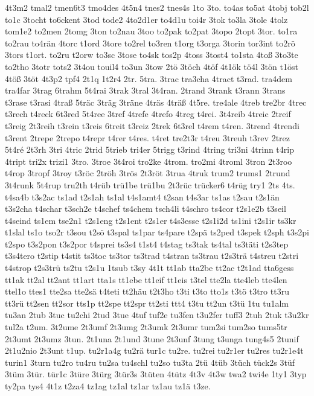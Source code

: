 {4t3m2
tmal2
tmen6t3
tmo4des
4t5n4
tnes2
tnes4s
1to
3to.
to4as
to5at
4tobj
tob2l
to1c
3tocht
to6ckent
3tod
tode2
4to2d1er
to4d1u
toi4r
3tok
to3la
3tole
4tolz
tom1e2
to2men
2tomg
3ton
to2nau
3too
to2pak
to2pat
3topo
2topt
3tor.
to1ra
to2rau
to4rän
4torc
t1ord
3tore
to2rel
to3ren
t1org
t3orga
3torin
tor3int
to2rö
3tors
t1ort.
to2ru
t2orw
to3sc
3tose
to4sk
tos2p
4toss
3tost4
to1sta
4toß
3to3te
to2tho
3totr
tots2
3t4ou
touil4
to3un
3tow
2tö
3töch
4töf
4t1ök
tö4l
3tön
t1öst
4töß
3töt
4t3p2
tpf4
2t1q
1t2r4
2tr.
5tra.
3trac
tra3cha
4tract
t3rad.
tra4dem
tra4far
3trag
6trahm
5t4rai
3trak
3tral
3t4ran.
2trand
3trank
t3rann
3trans
t3rase
t3rasi
4traß
5träc
3träg
3träne
4träs
4träß
4t5re.
tre4ale
4treb
tre2br
4trec
t3rech
t4reck
6t3red
5t4ree
3tref
4trefe
4trefo
4treg
t4rei.
3t4reib
4treic
2treif
t3reig
2t3reih
t3rein
t3reis
6treit
t3reiz
2trek
6t3rel
t4rem
t4ren.
3trend
4trendi
t3rent
2trepe
2trepo
t4repr
t4rer
t4res.
t4ret
tre2t3r
t4reu
3treuh
t3rev
2trez
5t4ré
2t3rh
3tri
4tric
2trid
5trieb
tri4er
5trigg
t3rind
4tring
tri3ni
4trinn
t4rip
4tript
tri2x
trizi1
3tro.
3troe
3t4roi
tro2ke
4trom.
tro2mi
4troml
3tron
2t3roo
t4rop
3tropf
3troy
t3röc
2tröh
3trös
2t3röt
3trua
4truk
trum2
trums1
2trund
3t4runk
5t4rup
tru2th
t4rüb
trü1be
trü1bu
2t3rüc
trücker6
t4rüg
try1
2ts
4ts.
t4sa4b
t3s2ac
ts1ad
t2s1ah
ts1al
t4s1amt4
t2san
t4s3ar
ts1as
t2sau
t2s1än
t3s2cha
t4schar
t3sch2e
t4schef
ts4chem
tsch4li
t4schro
ts4cor
t2s1e2b
t3seil
t4seind
ts1em
tse2n1
t2s1eng
t2s1ent
t2s1er
t4s3esse
t2s1i2d
ts1ini
t2s1ir
ts3kr
t1slal
ts1o
tso2r
t3sou
t2sö
t3spal
ts1par
ts4pare
t2spä
ts2ped
t3spek
t2sph
t3s2pi
t2spo
t3s2pon
t3s2por
t4sprei
ts3s4
t1st4
t4stag
ts3tak
ts4tal
ts3täti
t2s3tep
t3s4tero
t2stip
t4stit
ts3toc
ts3tor
ts3trad
t4stran
ts3trau
t2s3trä
t4streu
t2stri
t4strop
t2s3trü
ts2tu
t2s1u
1tsub
t3sy
4t1t
tt1ab
tta2be
tt2ac
t2t1ad
tta6gess
tt1ak
tt2al
tt2ant
tt1art
tta1s
tt1ebe
tt1eif
tt1eis
t3tel
tte2la
tte4leb
tte4len
ttel1o
ttes1
tte2sa
tte2sä
t4teti
tt2häu
t2t3ho
t3ti
t3to
tto1s
t3tö
t3tro
tt3ru
tt3rü
tt2sen
tt2sor
tts1p
tt2spe
tt2spr
tt2sti
ttt4
t3tu
tt2un
t3tü
1tu
tu1alm
tu3an
2tub
3tuc
tu2chi
2tud
3tue
4tuf
tuf2e
tu3fen
t3u2fer
tuff3
2tuh
2tuk
t3u2kr
tul2a
t2um.
3t2ume
2t3umf
2t3umg
2t3umk
2t3umr
tum2si
tum2so
tums5tr
2t3umt
2t3umz
3tun.
2t1una
2t1und
3tune
2t3unf
3tung
t3unga
tung4s5
2tunif
2t1u2nio
2t3unt
t1up.
tu2r1a4g
tu2rä
tur1c
tu2re.
tu2rei
tu2r1er
tu2res
tu2r1e4t
turin1
3turn
tu2ro
tu4ru
tu2sa
tu4schl
tu2so
tu3ta
2tü
4tüb
3tüch
tück2s
3tüf
3tüm
3tür.
tür1c
3türe
3türg
3tür3s
3tüten
4tütz
4t3v
4t3w
twa2
twi4e
1ty1
3typ
ty2pa
tys4
4t1z
t2za4
tz1ag
tz1al
tz1ar
tz1au
tz1ä
t3ze.
}
